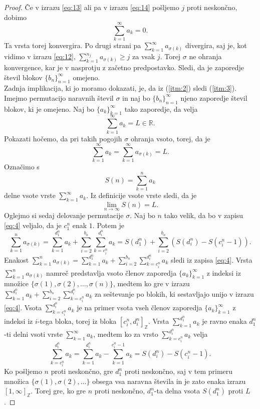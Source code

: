 \documentclass[12pt,a4paper,reqno]{amsart}
\theoremstyle{definition} %
\theoremstyle{plain} %
\newcommand{\R}{\mathbb R}
\newcommand{\Z}{\mathbb Z}
\begin{document}
\begin{proof}
Če v izrazu \eqref{eq:13} ali pa v izrazu \eqref{eq:14} pošljemo $j$ proti neskončno, dobimo $$\sum_{k=1}^{\infty}a_k=0.$$ Ta vrsta torej konvergira. Po drugi strani pa $\sum_{k=1}^{\infty}a_{\sigma(k)}$ divergira, saj je, kot vidimo v izrazu \eqref{eq:12}, $\sum_{k=1}^{n_j}a_{\sigma(k)}\geq j$ za vsak $j$. Torej $\sigma$ ne ohranja konvergence, kar je v nasprotju z začetno predpostavko. Sledi, da je zaporedje števil blokov $\{b_n\}^{\infty}_{n=1}$ omejeno.\\

Zadnja implikacija, ki jo moramo dokazati, je, da iz (\ref{itm:2}) sledi (\ref{itm:3}).
Imejmo permutacijo naravnih števil $\sigma$ in naj bo $\{b_n\}_{n=1}^{\infty}$ njeno zaporedje števil blokov, ki je omejeno. Naj bo $\{a_k\}_{k=1}^{\infty}$ tako zaporedje, da velja $$\sum_{k=1}^{\infty}a_k=L\in \R.$$ Pokazati hočemo, da pri takih pogojih $\sigma$ ohranja vsoto, torej, da je $$\sum_{k=1}^{\infty}a_k=\sum_{k=1}^{\infty}a_{\sigma(k)}=L.$$ 
Označimo s $$S(n)=\sum_{k=1}^{n}a_k$$ delne vsote vrste $\sum_{k=1}^{\infty}a_k$. Iz definicije vsote vrste sledi, da je $$\lim_{n\to \infty}S(n)=L.$$ Oglejmo si sedaj delovanje permutacije $\sigma$. Naj bo $n$ tako velik, da bo v zapisu \eqref{eq:4} veljalo, da je $c^n_1$ enak $1$. Potem je 
\begin{equation} \label{eq:5}
\sum_{k=1}^{n}a_{\sigma(k)}=\sum_{k=1}^{d_1^n}a_k+\sum_{i=2}^{b_n}\sum_{k=c_i^n}^{d_i^n}a_k = S(d_1^n)+\sum_{i=2}^{b_n}(S(d_i^n)-S(c_i^n-1)).
\end{equation}
Enakost $\sum_{k=1}^{n}a_{\sigma(k)}=\sum_{k=1}^{d_1^n}a_k+\sum_{i=2}^{b_n}\sum_{k=c_i^n}^{d_i^n}a_k$ sledi iz zapisa \eqref{eq:4}. Vrsta $\sum_{k=1}^{n}a_{\sigma(k)}$  namreč predstavlja vsoto členov zaporedja $\{a_k\}_{k=1}^{\infty}$ z indeksi iz množice $\{\sigma(1), \sigma(2), \ldots, \sigma(n)\}$, medtem ko gre v izrazu $\sum_{k=1}^{d_1^n}a_k+\sum_{i=2}^{b_n}\sum_{k=c_i^n}^{d_i^n}a_k$ za seštevanje po blokih, ki sestavljajo unijo v izrazu \eqref{eq:4}. Vsota $\sum_{k=c_i^n}^{d_i^n}a_k$ je na primer vsota vseh členov zaporedja $\{a_k\}_{k=1}^{\infty}$ z indeksi iz $i$-tega bloka, torej iz bloka $[c^n_i, d^n_i]_{\Z}$.
Vrsta $\sum_{k=1}^{d_1^n}a_k$ je ravno enaka $d_1^n$-ti delni vsoti vrste $\sum_{k=1}^{\infty}a_k$, medtem ko za vrsto $\sum_{k=c_i^n}^{d_i^n}a_k$ velja $$\sum_{k=c_i^n}^{d_i^n}a_k=\sum_{k=1}^{d_i^n}a_k -\sum_{k=1}^{c_i^n-1}a_k=S(d_i^n)-S(c_i^n-1).$$
Ko pošljemo $n$ proti neskončno, gre $d_1^n$ proti neskončno, saj v tem primeru množica $\{\sigma(1), \sigma(2), \ldots \}$ obsega vsa naravna števila in je zato enaka izrazu $[1,\infty]_{\Z}$. Torej gre, ko gre $n$ proti neskončno, $d_1^n$-ta delna vsota $S(d_1^n)$ proti $L$. 

\end{proof}
\end{document}
